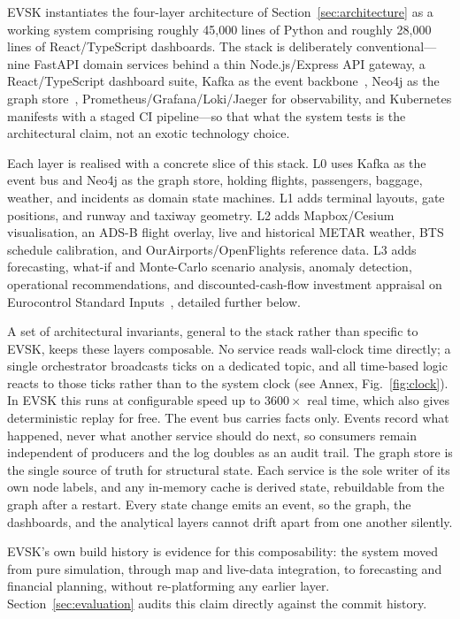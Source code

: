 \documentclass[runningheads]{llncs}
\begin{document}
EVSK instantiates the four-layer architecture of Section~\ref{sec:architecture} as a working system comprising roughly 45{,}000 lines of Python and roughly 28{,}000 lines of React/TypeScript dashboards. The stack is deliberately conventional---nine FastAPI domain services behind a thin Node.js/Express API gateway, a React/TypeScript dashboard suite, Kafka as the event backbone~\cite{kreps2011}, Neo4j as the graph store~\cite{angles2008}, Prometheus/Grafana/Loki/Jaeger for observability, and Kubernetes manifests with a staged CI pipeline---so that what the system tests is the architectural claim, not an exotic technology choice.

Each layer is realised with a concrete slice of this stack. L0 uses Kafka as the event bus and Neo4j as the graph store, holding flights, passengers, baggage, weather, and incidents as domain state machines. L1 adds terminal layouts, gate positions, and runway and taxiway geometry. L2 adds Mapbox/Cesium visualisation, an ADS-B flight overlay, live and historical METAR weather, BTS schedule calibration, and OurAirports/OpenFlights reference data. L3 adds forecasting, what-if and Monte-Carlo scenario analysis, anomaly detection, operational recommendations, and discounted-cash-flow investment appraisal on Eurocontrol Standard Inputs~\cite{eurocontrol2024}, detailed further below.

A set of architectural invariants, general to the stack rather than specific to EVSK, keeps these layers composable. No service reads wall-clock time directly; a single orchestrator broadcasts ticks on a dedicated topic, and all time-based logic reacts to those ticks rather than to the system clock (see Annex, Fig.~\ref{fig:clock}). In EVSK this runs at configurable speed up to $3600\times$ real time, which also gives deterministic replay for free. The event bus carries facts only. Events record what happened, never what another service should do next, so consumers remain independent of producers and the log doubles as an audit trail. The graph store is the single source of truth for structural state. Each service is the sole writer of its own node labels, and any in-memory cache is derived state, rebuildable from the graph after a restart. Every state change emits an event, so the graph, the dashboards, and the analytical layers cannot drift apart from one another silently.

EVSK's own build history is evidence for this composability: the system moved from pure simulation, through map and live-data integration, to forecasting and financial planning, without re-platforming any earlier layer. Section~\ref{sec:evaluation} audits this claim directly against the commit history.
\end{document}
